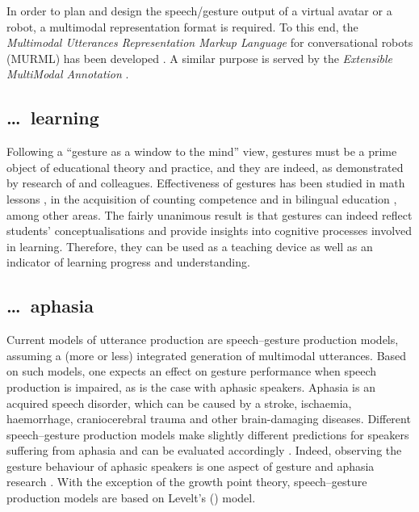 \documentclass[output=paper
 	        ,biblatex
                ,babelshorthands
                ,newtxmath
                ,draftmode
                ,colorlinks, citecolor=brown
]{langscibook}
\begin{document}
In order to plan and design the speech/gesture output of a virtual avatar or a robot, a multimodal representation format is required.
%
To this end, the \textit{Multimodal Utterances Representation Markup Language} for conversational robots (MURML) has been developed \citep{Kranstedt:Kopp:Wachsmuth:2002:b}.
%
A similar purpose is served by the \textit{Extensible MultiModal Annotation} \citep[EMMA;][]{Johnston:2009}.





\subsection{\ldots\ learning}
\label{sec:learning}

Following a \enquote{gesture as a window to the mind} view, gestures must be a prime object of educational theory and practice, and they are indeed, as demonstrated by research of \citet{Cook:Goldin-Meadow:2006} and colleagues.
%
Effectiveness of gestures has been studied in math lessons \citep{Goldin-Meadow:Nusbaum:Kelly:Wagner:2001}, in the acquisition of counting competence \citep{Alibali:DiRusso:1999} and in bilingual education \citep{Breckinridge-Church:Ayman-Nolley:Mahootian:2004}, among other areas.
%
The fairly unanimous result is that gestures can indeed reflect students' conceptualisations and provide insights into cognitive processes involved in learning.
%
Therefore, they can be used as a teaching device as well as an indicator of learning progress and understanding. 



\subsection{\ldots\ aphasia}
\label{sec:aphasia}

Current models of utterance production are speech--gesture production models, assuming a (more or less) integrated generation of multimodal utterances.
%
Based on such models, one expects an effect on gesture performance when speech production is impaired, as is the case with aphasic speakers. 
%
Aphasia is an acquired speech disorder, which can be caused by a stroke, ischaemia, haemorrhage, craniocerebral trauma and other brain-damaging diseases.
%
Different speech--gesture production models make slightly different predictions for speakers suffering from aphasia and can be evaluated accordingly \citep{deRuiter:deBeer:2013}.
%
Indeed, observing the gesture behaviour of aphasic speakers is one aspect of gesture and aphasia research \citep{Jakob:Bartmann:Goldenberg:Ziegler:Hogrefe:2011,Kong:Law:Chak:2017,Sekine:Rose:2013}.
%
With the exception of the growth point theory, speech--gesture production models are based on Levelt's (\citeyear{Levelt:1989})  model.
\end{document}
